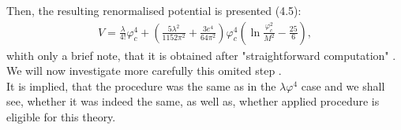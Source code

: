 Then, the resulting renormalised potential is presented \cite{Coleman1973}(4.5):
\begin{align}
V = \frac{\lambda}{4!}\varphi_c^4+\left(\frac{5\lambda^2}{1152\pi^2}+\frac{3e^4}{64\pi^2}\right)
\varphi_c^4\left(\ln\frac{\varphi_c^2}{M^2}-\frac{25}{6}\right),
\end{align}
whith only a brief note, that it is obtained after "straightforward computation" 
.\\
We will now investigate more carefully this omited step
.\\
It is implied, that the procedure was the same as in the $\lambda\varphi^4$ case and we shall see, 
whether it was indeed the same, as well as, whether applied procedure is eligible for this theory.\\

